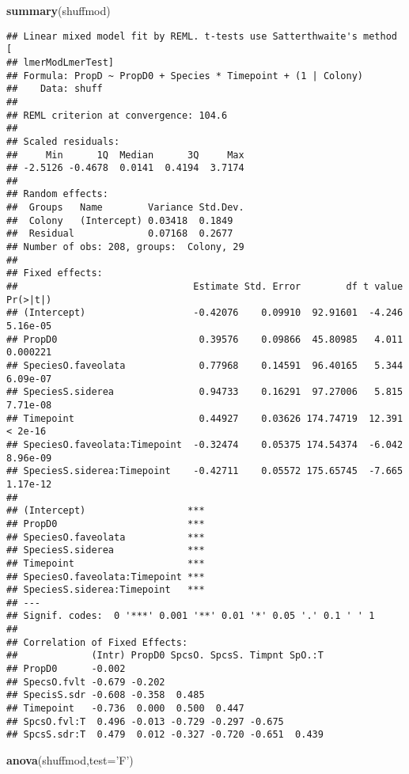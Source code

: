 \documentclass[]{article}
\newenvironment{Shaded}{\begin{snugshade}}{\end{snugshade}}
\newcommand{\DataTypeTok}[1]{\textcolor[rgb]{0.13,0.29,0.53}{#1}}
\newcommand{\KeywordTok}[1]{\textcolor[rgb]{0.13,0.29,0.53}{\textbf{#1}}}
\newcommand{\NormalTok}[1]{#1}
\newcommand{\StringTok}[1]{\textcolor[rgb]{0.31,0.60,0.02}{#1}}
\begin{document}
\begin{Shaded}
\begin{Highlighting}[]
\KeywordTok{summary}\NormalTok{(shuffmod)}
\end{Highlighting}
\end{Shaded}

\begin{verbatim}
## Linear mixed model fit by REML. t-tests use Satterthwaite's method [
## lmerModLmerTest]
## Formula: PropD ~ PropD0 + Species * Timepoint + (1 | Colony)
##    Data: shuff
## 
## REML criterion at convergence: 104.6
## 
## Scaled residuals: 
##     Min      1Q  Median      3Q     Max 
## -2.5126 -0.4678  0.0141  0.4194  3.7174 
## 
## Random effects:
##  Groups   Name        Variance Std.Dev.
##  Colony   (Intercept) 0.03418  0.1849  
##  Residual             0.07168  0.2677  
## Number of obs: 208, groups:  Colony, 29
## 
## Fixed effects:
##                               Estimate Std. Error        df t value Pr(>|t|)
## (Intercept)                   -0.42076    0.09910  92.91601  -4.246 5.16e-05
## PropD0                         0.39576    0.09866  45.80985   4.011 0.000221
## SpeciesO.faveolata             0.77968    0.14591  96.40165   5.344 6.09e-07
## SpeciesS.siderea               0.94733    0.16291  97.27006   5.815 7.71e-08
## Timepoint                      0.44927    0.03626 174.74719  12.391  < 2e-16
## SpeciesO.faveolata:Timepoint  -0.32474    0.05375 174.54374  -6.042 8.96e-09
## SpeciesS.siderea:Timepoint    -0.42711    0.05572 175.65745  -7.665 1.17e-12
##                                 
## (Intercept)                  ***
## PropD0                       ***
## SpeciesO.faveolata           ***
## SpeciesS.siderea             ***
## Timepoint                    ***
## SpeciesO.faveolata:Timepoint ***
## SpeciesS.siderea:Timepoint   ***
## ---
## Signif. codes:  0 '***' 0.001 '**' 0.01 '*' 0.05 '.' 0.1 ' ' 1
## 
## Correlation of Fixed Effects:
##             (Intr) PropD0 SpcsO. SpcsS. Timpnt SpO.:T
## PropD0      -0.002                                   
## SpecsO.fvlt -0.679 -0.202                            
## SpecisS.sdr -0.608 -0.358  0.485                     
## Timepoint   -0.736  0.000  0.500  0.447              
## SpcsO.fvl:T  0.496 -0.013 -0.729 -0.297 -0.675       
## SpcsS.sdr:T  0.479  0.012 -0.327 -0.720 -0.651  0.439
\end{verbatim}

\begin{Shaded}
\begin{Highlighting}[]
\KeywordTok{anova}\NormalTok{(shuffmod,}\DataTypeTok{test=}\StringTok{'F'}\NormalTok{)}
\end{Highlighting}
\end{Shaded}
\end{document}
